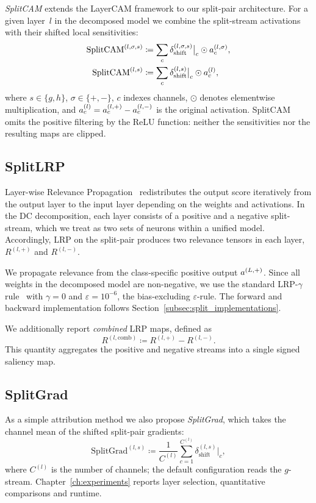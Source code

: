 \emph{SplitCAM} extends the LayerCAM framework to our split-pair architecture. For a given layer~$l$ in the decomposed model we combine the split-stream activations with their shifted local sensitivities:
\begin{align}
\text{SplitCAM}^{(l,\sigma,s)} &\coloneqq \sum_c \delta_{\mathrm{shift}}^{(l,\sigma,s)}\big\vert_c\odot a^{(l,\sigma)}_c,
\label{eq:splitcam_stream}\\
\text{SplitCAM}^{(l,s)} &\coloneqq \sum_c \delta_{\mathrm{shift}}^{(l,s)}\big\vert_c\odot a^{(l)}_c,
\label{eq:splitcam_combined}
\end{align}
where $s\in\{g,h\}$, $\sigma\in\{+,-\}$, $c$ indexes channels, $\odot$ denotes elementwise multiplication, and $a^{(l)}_c=a^{(l,+)}_c-a^{(l,-)}_c$ is the original activation. SplitCAM omits the positive filtering by the ReLU function: neither the sensitivities nor the resulting maps are clipped.

\subsection{SplitLRP}\label{sec:split_lrp}

Layer-wise Relevance Propagation~\parencite{Bach2015} redistributes the output score iteratively from the output layer to the input layer depending on the weights and activations. In the DC decomposition, each layer consists of a positive and a negative split-stream, which we treat as two sets of neurons within a unified model. Accordingly, LRP on the split-pair produces two relevance tensors in each layer, $R^{(l,+)}$ and $R^{(l,-)}$.

We propagate relevance from the class-specific positive output $a^{(L,+)}$. Since all weights in the decomposed model are non-negative, we use the standard LRP-$\gamma$ rule~\parencite{Montavon_2022_gammaLRP} with $\gamma=0$ and $\varepsilon=10^{-6}$, the bias-excluding $\varepsilon$-rule. The forward and backward implementation follows Section~\ref{subsec:split_implementations}.

We additionally report \emph{combined} LRP maps, defined as
\begin{equation}
R^{(l,\mathrm{comb})}\coloneqq R^{(l,+)}-R^{(l,-)}.
\label{eq:splitlrp_combined}
\end{equation}
This quantity aggregates the positive and negative streams into a single signed saliency map.

\subsection{SplitGrad}\label{sec:split_grad}

As a simple attribution method we also propose \emph{SplitGrad}, which takes the channel mean of the shifted split-pair gradients:
\begin{equation}
\text{SplitGrad}^{(l,s)}\coloneqq\frac{1}{C^{(l)}}\sum_{c=1}^{C^{(l)}}\delta_{\mathrm{shift}}^{(l,s)}\big\vert_c,
\label{eq:splitgrad}
\end{equation}
where $C^{(l)}$ is the number of channels; the default configuration reads the $g$-stream. Chapter~\ref{ch:experiments} reports layer selection, quantitative comparisons and runtime.

